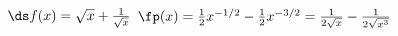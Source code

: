 {$\ds f(x) = \sqrt{x} + \frac1{\sqrt{x}}$
}
{$\fp(x) = \frac12x^{-1/2} - \frac12x^{-3/2} = \frac1{2\sqrt{x}}-\frac1{2\sqrt{x^3}}$
}
